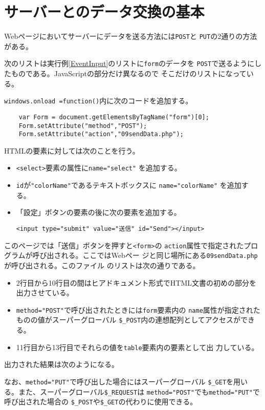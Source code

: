 \section{サーバーとのデータ交換の基本}
Webページにおいてサーバーにデータを送る方法には\texttt{POST}と
\texttt{PUT}の2通りの方法がある。
\begin{Exec}\upshape\label{dataexchange}
 次のリストは実行例\ref{EventInput}のリストに\texttt{form}のデータを
 \texttt{POST}で送るようにしたものである。JavaScriptの部分だけ異なるので
 そこだけのリストになっている。

\texttt{windows.onload =function()}内に次のコードを追加する。
\begin{Verbatim}
    var Form = document.getElementsByTagName("form")[0];
    Form.setAttribute("method","POST");
    Form.setAttribute("action","09sendData.php");
\end{Verbatim}
HTMLの要素に対しては次のことを行う。
\begin{itemize}
 \item \texttt{<select>}要素の属性に\Verb+name="select"+ を追加する。
 \item \texttt{id}が\Verb+"colorName"+であるテキストボックスに
       \Verb+name="colorName"+ を追加する。
 \item 「設定」ボタンの要素の後に次の要素を追加する。
\begin{center}
\Verb+<input type="submit" value="送信" id="Send"></input>+ 
\end{center}
\end{itemize}
このページでは「送信」ボタンを押すと\texttt{<form>}の
\texttt{action}属性で指定されたプログラムが呼び出される。ここではWebペー
 ジと同じ場所にある\texttt{09sendData.php}が呼び出される。このファイル
 のリストは次の通りである。
\begin{itemize}
 \item 2行目から10行目の間はヒアドキュメント形式でHTML文書の初めの部分を
       出力させている。
 \item \Verb+method="POST"+で呼び出されたときには\texttt{form}要素内の
       \texttt{name}属性が指定されたものの値がスーパーグローバル
       \Verb+$_POST+内の連想配列としてアクセスができる。
 \item 11行目から13行目でそれらの値を\texttt{table}要素内の要素として出
       力している。
\end{itemize}
出力された結果は次のようになる。
\end{Exec}
なお、\Verb+method="PUT"+で呼び出した場合にはスーパーグローバル
\Verb+$_GET+を用いる。また、スーパーグローバル\Verb+$_REQUEST+は
\Verb+method="POST"+でも\Verb+method="PUT"+で呼び出された場合の
\Verb+$_POST+や\Verb+$_GET+の代わりに使用できる。

